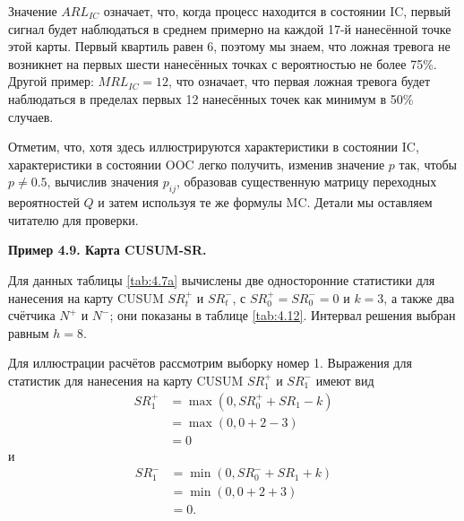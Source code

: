 Значение \(ARL_{IC}\) означает, что, когда процесс находится в состоянии IC, первый сигнал будет наблюдаться в среднем примерно на каждой 17-й нанесённой точке этой карты. Первый квартиль равен 6, поэтому мы знаем, что ложная тревога не возникнет на первых шести нанесённых точках с вероятностью не более 75\%. Другой пример: \(MRL_{IC} = 12\), что означает, что первая ложная тревога будет наблюдаться в пределах первых 12 нанесённых точек как минимум в 50\% случаев.

Отметим, что, хотя здесь иллюстрируются характеристики в состоянии IC, характеристики в состоянии OOC легко получить, изменив значение \(p\) так, чтобы \(p \ne 0.5\), вычислив значения \(p_{ij}\), образовав существенную матрицу переходных вероятностей \(Q\) и затем используя те же формулы MC. Детали мы оставляем читателю для проверки.

\noindent\textbf{Пример 4.9. Карта CUSUM-SR.}

Для данных таблицы \ref{tab:4.7a} вычислены две односторонние статистики для нанесения на карту CUSUM \(SR_t^+\) и \(SR_t^-\), с \(SR_0^+ = SR_0^- = 0\) и \(k = 3\), а также два счётчика \(N^+\) и \(N^-\); они показаны в таблице \ref{tab:4.12}. Интервал решения выбран равным \(h = 8\).

Для иллюстрации расчётов рассмотрим выборку номер 1. Выражения для статистик для нанесения на карту CUSUM \(SR_1^+\) и \(SR_1^-\) имеют вид
\begin{align*}
	SR_1^+ &= \max(0, SR_0^+ + SR_1 - k) \\
	       &= \max(0, 0 + 2 - 3) \\
	       &= 0
\end{align*}
и
\begin{align*}
	SR_1^- &= \min(0, SR_0^- + SR_1 + k) \\
	       &= \min(0, 0 + 2 + 3) \\
	       &= 0.
\end{align*}

